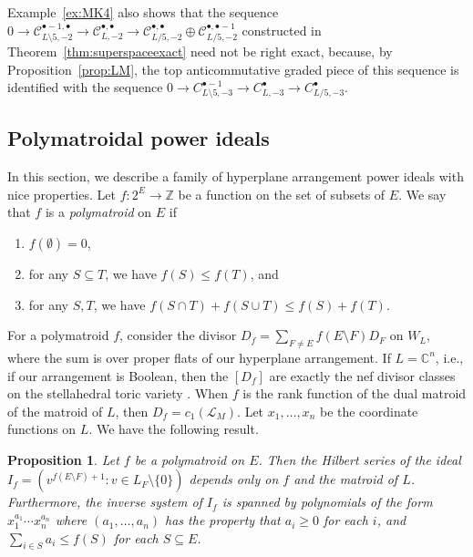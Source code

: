 \documentclass{amsart}
\newtheorem{proposition}[theorem]{Proposition}
\theoremstyle{definition}
\begin{document}
Example~\ref{ex:MK4} also shows that the sequence $0 \to \mathcal{C}_{L \setminus 5, -2}^{\bullet - 1, \bullet} \to \mathcal{C}_{L, -2}^{\bullet, \bullet} \to \mathcal{C}_{L/5, -2}^{\bullet, \bullet} \oplus \mathcal{C}_{L/5, -2}^{\bullet, \bullet - 1}$ constructed in Theorem~\ref{thm:superspaceexact} need not be right exact, because, by Proposition~\ref{prop:LM}, the top anticommutative graded piece of this sequence is identified with the sequence $0 \to C_{L \setminus 5, -3}^{\bullet - 1} \to C_{L, -3}^{\bullet} \to C_{L/5, -3}^{\bullet}$. 



\subsection{Polymatroidal power ideals} 
In this section, we describe a family of hyperplane arrangement power ideals with nice properties. Let $f \colon 2^E \to \mathbb{Z}$ be a function on the set of subsets of $E$. We say that $f$ is a \emph{polymatroid} on $E$ if 
\begin{enumerate}
\item $f(\emptyset) = 0$, 
\item for any $S \subseteq T$, we have $f(S) \le f(T)$, and
\item for any $S, T$, we have $f(S \cap T) + f(S \cup T) \le f(S) + f(T)$. 
\end{enumerate}
For a polymatroid $f$, consider the divisor $D_f = \sum_{F \not= E} f(E \setminus F) D_F$ on $W_L$, where the sum is over proper flats of our hyperplane arrangement. If $L = \mathbb{C}^n$, i.e., if our arrangement is Boolean, then the $[D_f]$ are exactly the nef divisor classes on the stellahedral toric variety \cite[Proposition 3.13]{EHL}. When $f$ is the rank function of the dual matroid of the matroid of $L$, then $D_f = c_1(\mathcal{L}_M)$. 
Let $x_1, \dotsc, x_n$ be the coordinate functions on $L$.  We have the following result.

\begin{proposition}\label{prop:polymatroid}
Let $f$ be a polymatroid on $E$. Then the Hilbert series of the ideal $I_f = (v^{f(E \setminus F) + 1} : v \in L_F \setminus \{0\})$ depends only on $f$ and the matroid of $L$. Furthermore, the inverse system of $I_f$ is spanned by polynomials of the form $x_1^{a_1} \dotsb x_n^{a_n}$ where $(a_1, \dotsc, a_n)$ has the property that $a_i \ge 0$ for each $i$, and $\sum_{i \in S} a_i \le f(S)$ for each $S \subseteq E$. 
\end{proposition}
\end{document}
